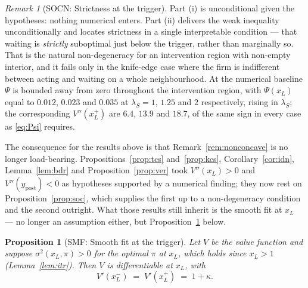 \documentclass[11pt]{article}
\newtheorem{proposition}{Proposition}
\theoremstyle{remark}
\newtheorem{remark}{Remark}
\begin{document}
\begin{remark}[SOCN: Strictness at the trigger]
\label{rem:socn}
Part (i) is unconditional given the hypotheses: nothing numerical enters.
Part (ii) delivers the weak inequality unconditionally and locates
strictness in a single interpretable condition --- that waiting is
\emph{strictly} suboptimal just below the trigger, rather than marginally
so. That is the natural non-degeneracy for an intervention region with
non-empty interior, and it fails only in the knife-edge case where the
firm is indifferent between acting and waiting on a whole neighbourhood.
At the numerical baseline $\Psi$ is bounded away from zero throughout the
intervention region, with $\Psi(x_L)$ equal to $0.012$, $0.023$ and
$0.035$ at $\lambda_S = 1$, $1.25$ and $2$ respectively, rising in
$\lambda_S$; the corresponding $V''(x_L^+)$ are $6.4$, $13.9$ and $18.7$,
of the same sign in every case as \eqref{eq:Psi} requires.

The consequence for the results above is that
Remark~\ref{rem:nonconcave} is no longer load-bearing.
Propositions~\ref{prop:tcs} and~\ref{prop:kcs},
Corollary~\ref{cor:idn}, Lemma~\ref{lem:bdr} and
Proposition~\ref{prop:ver} took $V''(x_L)>0$ and
$V''(y_{\mathrm{post}})<0$ as hypotheses supported by a numerical
finding; they now rest on Proposition~\ref{prop:soc}, which supplies the
first up to a non-degeneracy condition and the second outright. What
those results still inherit is the smooth fit at $x_L$ --- no longer an
assumption either, but Proposition~\ref{prop:smf} below.
\end{remark}

\begin{proposition}[SMF: Smooth fit at the trigger]
\label{prop:smf}
Let $V$ be the value function and suppose $\sigma^2(x_L,\pi)>0$ for the
optimal $\pi$ at $x_L$, which holds since $x_L>1$
(Lemma~\ref{lem:itr}). Then $V$ is differentiable at $x_L$, with
\[
V'(x_L^-) \;=\; V'(x_L^+) \;=\; 1+\kappa .
\]
\end{proposition}
\end{document}
